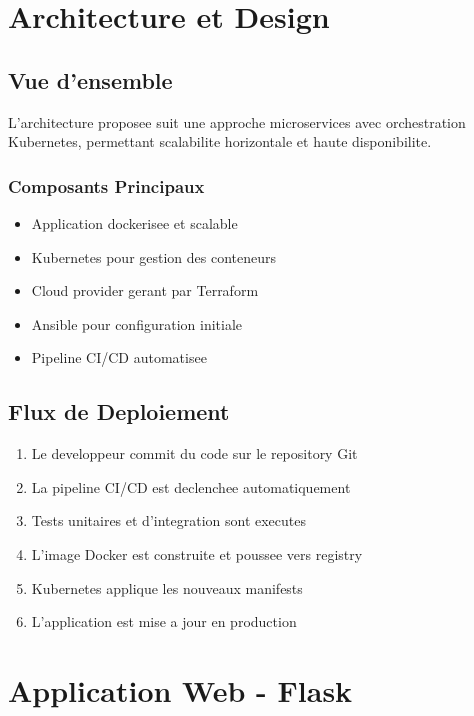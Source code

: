 \documentclass[12pt,a4paper]{report}
\begin{document}
\newpage

\chapter{Architecture et Design}

\section{Vue d'ensemble}

L'architecture proposee suit une approche microservices avec orchestration Kubernetes, permettant scalabilite horizontale et haute disponibilite.

\subsection{Composants Principaux}

\begin{itemize}
    \item Application dockerisee et scalable
    \item Kubernetes pour gestion des conteneurs
    \item Cloud provider gerant par Terraform
    \item Ansible pour configuration initiale
    \item Pipeline CI/CD automatisee
\end{itemize}

\section{Flux de Deploiement}

\begin{enumerate}
    \item Le developpeur commit du code sur le repository Git
    \item La pipeline CI/CD est declenchee automatiquement
    \item Tests unitaires et d'integration sont executes
    \item L'image Docker est construite et poussee vers registry
    \item Kubernetes applique les nouveaux manifests
    \item L'application est mise a jour en production
\end{enumerate}

\newpage

\chapter{Application Web - Flask}
\end{document}
